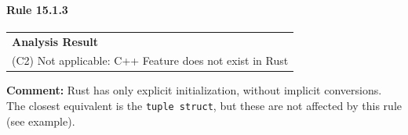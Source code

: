 \paragraph{Rule 15.1.3}
\begin{longtable}{p{13cm}}
\textbf{Analysis Result} \\
(C2) Not applicable: C++ Feature does not exist in Rust \\
\end{longtable}
\textbf{Comment:} Rust has only explicit initialization, without implicit conversions. The closest equivalent is the \texttt{tuple struct}, but these are not affected by this rule (see example). \\


